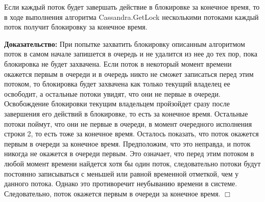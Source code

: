 \begin{theorem}
Если каждый поток будет завершать действие в блокировке за конечное время, то в ходе выполнения алгоритма Cassandra.GetLock несколькими потоками каждый поток получит блокировку за конечное время.
\end{theorem}
\textbf{Доказательство:}
При попытке захватить блокировку описанным алгоритмом поток в самом начале запишется в очередь и не удалится из нее до тех пор, пока блокировка не будет захвачена. Если поток в некоторый момент времени окажется первым в очереди и в очередь никто не сможет записаться перед этим потоком, то блокировка будет захвачена как только текущий владелец ее освободит, а остальные потоки увидят, что они не первые в очереди. Освобождение блокировки текущим владельцем пройзойдет сразу после завершения его действий в блокировке, то есть за конечное время. Остальные потоки поймут, что они не первые в очереди, в момент очередного исполнения строки 2, то есть тоже за конечное время.
Осталось показать, что поток окажется первым в очереди за конечное время.
Предположим, что это неправда, и поток никогда не окажется в очереди первым. Это означает, что перед этим потоком в любой момент времени найдется хотя бы один поток, следовательно потоки будут постоянно записываться с меньшей или равной временной отметкой, чем у данного потока. Однако это противоречит неубыванию времени в системе. Следовательно, поток окажется первым в очереди за конечное время.
$\Box$
